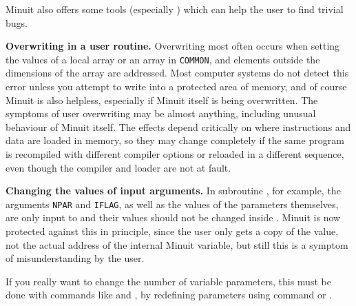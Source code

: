 \begin{UL}
      Minuit also offers some tools (especially ) 
      which can help the user to find trivial bugs.
\item {\bf Overwriting in a user routine.}
      Overwriting most often occurs when setting the values of a local
      array or an array in \texttt{COMMON}, and elements outside the
      dimensions of the array are addressed.
      Most computer systems do not detect this error unless you attempt to
      write into a protected area of memory, and of course Minuit is also
      helpless, especially if Minuit itself is being overwritten.
      The symptoms of user overwriting may be almost anything,
      including unusual behaviour of Minuit itself.
      The effects depend critically on where instructions and data are
      loaded in memory, so they may change completely if the same
      program is recompiled with different compiler options or reloaded
      in a different sequence, even though the compiler and loader
      are not at fault.
\item {\bf Changing the values of input arguments.}
      In subroutine , for example, the arguments \texttt{NPAR} and \texttt{IFLAG},
      as well as the values of the parameters themselves, are only
      input to  and their values should not be changed inside .
      Minuit is now protected against this in principle, since
      the user only gets a copy of the value, not the actual address
      of the internal Minuit variable, but still this is a symptom of
      misunderstanding by the user.
       
      If you really want to change the number of variable parameters,
      this must be done with commands like  and , 
      by redefining parameters using command 
      or .
       

\end{UL}
